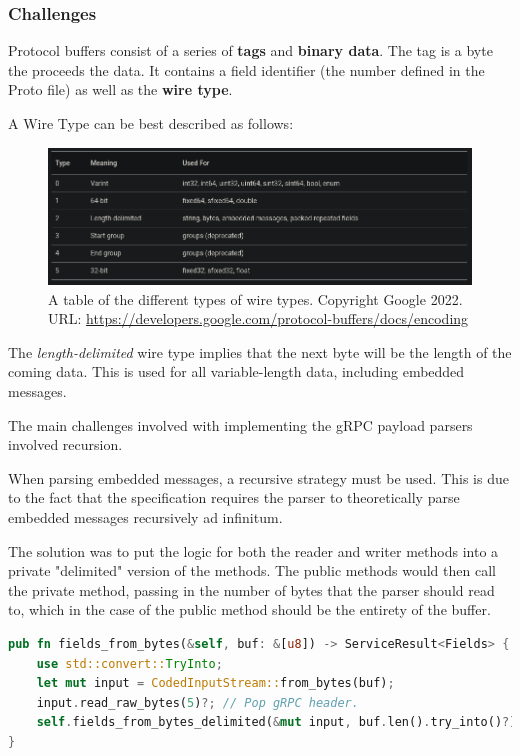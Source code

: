 \documentclass[a4paper,12pt]{report}
\begin{document}
\subsubsection{Challenges}

Protocol buffers consist of a series of \textbf{tags} and \textbf{binary data}.
The tag is a byte the proceeds the data. It contains a field identifier (the number defined in the Proto file) as well as the \textbf{wire type}.

A Wire Type can be best described as follows:

\begin{figure}[hbt!]
    \centering
    \includegraphics[width=\linewidth]{wire.png}
    \caption{A table of the different types of wire types. Copyright Google 2022. URL: \href{https://developers.google.com/protocol-buffers/docs/encoding}{https://developers.google.com/protocol-buffers/docs/encoding}}
    \label{fig:admin}
\end{figure}
\newpage

The \textit{length-delimited} wire type implies that the next byte will be the length of the coming data. This is used for all variable-length data,
including embedded messages.

The main challenges involved with implementing the gRPC payload parsers involved recursion.

When parsing embedded messages, a recursive strategy must be used. This is due to the fact that the specification requires the parser to theoretically parse embedded messages recursively ad infinitum.

The solution was to put the logic for both the reader and writer methods into a private "delimited" version of the methods.
The public methods would then call the private method, passing in the number of bytes that the parser should read to, which in the case of
the public method should be the entirety of the buffer.

\begin{lstlisting}[language=Rust]
pub fn fields_from_bytes(&self, buf: &[u8]) -> ServiceResult<Fields> {
    use std::convert::TryInto;
    let mut input = CodedInputStream::from_bytes(buf);
    input.read_raw_bytes(5)?; // Pop gRPC header.
    self.fields_from_bytes_delimited(&mut input, buf.len().try_into()?)
}
\end{lstlisting}
\end{document}
